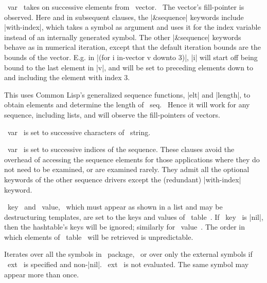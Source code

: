 \begin{clauses}
~var~ takes on successive elements from ~vector.~   The vector's
fill-pointer is observed.  Here and in subsequent clauses, the |\&sequence|
keywords include |with-index|, which takes a symbol as argument
and uses it for the index variable instead of an internally generated
symbol.  The other |\&sequence| keywords behave as in numerical
iteration, except that the default iteration bounds are the bounds of
the vector.  E.g. in |(for i in-vector v downto 3)|,
|i| will start off being bound to the last element in |v|,
and will
be set to preceding elements down to and including the element with
index 3.

This uses Common Lisp's generalized sequence functions, |elt|
and |length|, to obtain elements and determine the length of
~seq.~   Hence it will work for any sequence, including lists, and will
observe the fill-pointers of vectors.

~var~ is set to successive characters of ~string.~

\startitem
{}
\finishitem
~var~ is set to successive indices of the sequence.
These clauses avoid the overhead of accessing the sequence elements
for those applications where they do not need to be examined, or are
examined rarely.  They admit all the optional keywords of the other
sequence drivers except the (redundant) |with-index| keyword.


~key~ and ~value,~ which must appear as shown in a list
and may be destructuring templates, are set to the keys and values of
~table~.  If ~key~ is |nil|, then the hashtable's keys will be ignored;
similarly for ~value~.
The order in which
elements of ~table~ will be retrieved is unpredictable.

Iterates over all the symbols in ~package,~ or over only the
external symbols if ~ext~ is specified and non-|nil|.  ~ext~ is not
evaluated.  The same symbol may appear more than once.


\end{clauses}

